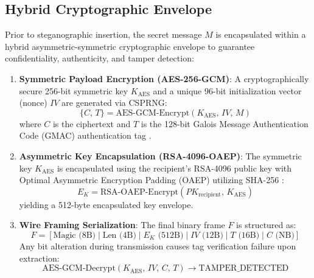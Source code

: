 \documentclass[conference]{IEEEtran}
\begin{document}
\subsection{Hybrid Cryptographic Envelope}
Prior to steganographic insertion, the secret message $M$ is encapsulated within a hybrid asymmetric-symmetric cryptographic envelope to guarantee confidentiality, authenticity, and tamper detection:
\begin{enumerate}
    \item \textbf{Symmetric Payload Encryption (AES-256-GCM)}: A cryptographically secure 256-bit symmetric key $K_{\text{AES}}$ and a unique 96-bit initialization vector (nonce) $IV$ are generated via CSPRNG:
    \begin{equation}
        \{C, \, T\} = \text{AES-GCM-Encrypt}(K_{\text{AES}}, \, IV, \, M)
    \end{equation}
    where $C$ is the ciphertext and $T$ is the 128-bit Galois Message Authentication Code (GMAC) authentication tag \cite{dworkin2007recommendation}.
    \item \textbf{Asymmetric Key Encapsulation (RSA-4096-OAEP)}: The symmetric key $K_{\text{AES}}$ is encapsulated using the recipient's RSA-4096 public key with Optimal Asymmetric Encryption Padding (OAEP) utilizing SHA-256 \cite{rfc3447}:
    \begin{equation}
        E_{K} = \text{RSA-OAEP-Encrypt}(PK_{\text{recipient}}, \, K_{\text{AES}})
    \end{equation}
    yielding a 512-byte encapsulated key envelope.
    \item \textbf{Wire Framing Serialization}: The final binary frame $F$ is structured as:
    \begin{equation}
        F = [\text{Magic (8B)} \mid \text{Len (4B)} \mid E_K \text{ (512B)} \mid IV \text{ (12B)} \mid T \text{ (16B)} \mid C \text{ (NB)}]
    \end{equation}
    Any bit alteration during transmission causes tag verification failure upon extraction:
    \begin{equation}
        \text{AES-GCM-Decrypt}(K_{\text{AES}}, \, IV, \, C, \, T) \to \text{TAMPER\_DETECTED}
    \end{equation}
\end{enumerate}
\end{document}

